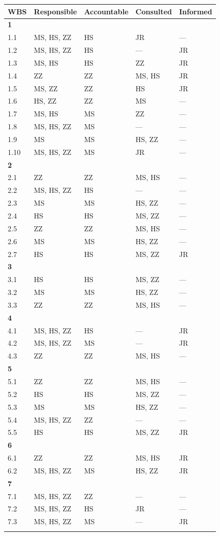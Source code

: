 \documentclass[
]{article}
\newcounter{none} %
\begin{document}
{\def\LTcaptype{none} %
\begin{longtable}[]{@{}lllll@{}}
\toprule\noalign{}
WBS & Responsible & Accountable & Consulted & Informed \\
\midrule\noalign{}
\endhead
\bottomrule\noalign{}
\endlastfoot
\textbf{1} & & & & \\
1.1 & MS, HS, ZZ & HS & JR & --- \\
1.2 & MS, HS, ZZ & HS & --- & JR \\
1.3 & MS, HS & HS & ZZ & JR \\
1.4 & ZZ & ZZ & MS, HS & JR \\
1.5 & MS, ZZ & ZZ & HS & JR \\
1.6 & HS, ZZ & ZZ & MS & --- \\
1.7 & MS, HS & MS & ZZ & --- \\
1.8 & MS, HS, ZZ & MS & --- & --- \\
1.9 & MS & MS & HS, ZZ & --- \\
1.10 & MS, HS, ZZ & MS & JR & --- \\
\textbf{2} & & & & \\
2.1 & ZZ & ZZ & MS, HS & --- \\
2.2 & MS, HS, ZZ & HS & --- & --- \\
2.3 & MS & MS & HS, ZZ & --- \\
2.4 & HS & HS & MS, ZZ & --- \\
2.5 & ZZ & ZZ & MS, HS & --- \\
2.6 & MS & MS & HS, ZZ & --- \\
2.7 & HS & HS & MS, ZZ & JR \\
\textbf{3} & & & & \\
3.1 & HS & HS & MS, ZZ & --- \\
3.2 & MS & MS & HS, ZZ & --- \\
3.3 & ZZ & ZZ & MS, HS & --- \\
\textbf{4} & & & & \\
4.1 & MS, HS, ZZ & HS & --- & JR \\
4.2 & MS, HS, ZZ & MS & --- & JR \\
4.3 & ZZ & ZZ & MS, HS & --- \\
\textbf{5} & & & & \\
5.1 & ZZ & ZZ & MS, HS & --- \\
5.2 & HS & HS & MS, ZZ & --- \\
5.3 & MS & MS & HS, ZZ & --- \\
5.4 & MS, HS, ZZ & ZZ & --- & --- \\
5.5 & HS & HS & MS, ZZ & JR \\
\textbf{6} & & & & \\
6.1 & ZZ & ZZ & MS, HS & JR \\
6.2 & MS, HS, ZZ & MS & HS, ZZ & JR \\
\textbf{7} & & & & \\
7.1 & MS, HS, ZZ & ZZ & --- & --- \\
7.2 & MS, HS, ZZ & HS & JR & --- \\
7.3 & MS, HS, ZZ & MS & --- & JR \\
& & & & \\
\end{longtable}
}
\end{document}
